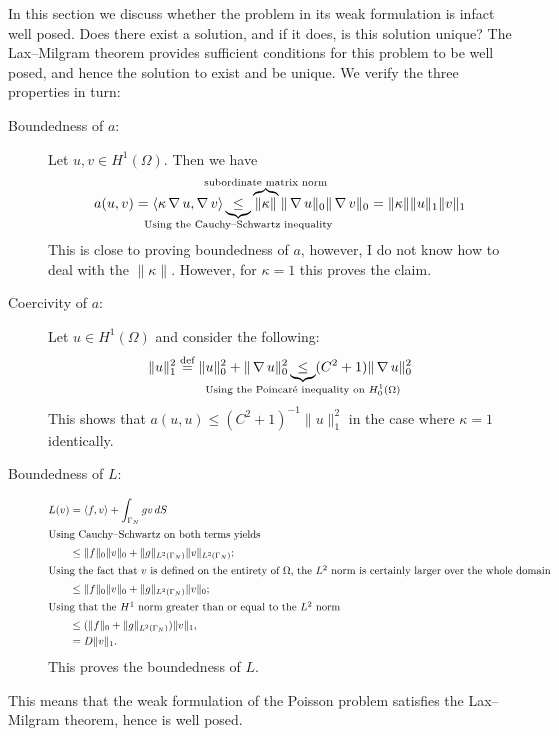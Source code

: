 In this section we discuss whether the problem in its weak formulation is
infact well posed. Does there exist a solution, and if it does, is this
solution unique? The Lax--Milgram theorem provides sufficient conditions for
this problem to be well posed, and hence the solution to exist and be unique.
We verify the three properties in turn:
\begin{description}
    \item[Boundedness of \( a \):]
        Let \( u, v \in H^1(\Omega) \). Then we have
        \begin{equation}
            a(u, v) = \langle \kappa \grad u, \grad v\rangle
            \underbrace{\leq}_{\mathclap{\text{Using the Cauchy--Schwartz inequality}}} 
            \overbrace{\|\kappa\|}^{\mathclap{\text{subordinate matrix norm}}} 
            \| \grad u \|_0 \| \grad v \|_0
            = \|\kappa\| \| u \|_1 \| v \|_1
        \end{equation}
        This is close to proving boundedness of \( a \), however, I do not know
        how to deal with the \( \| \kappa \| \). However, for \( \kappa = 1\)
        this proves the claim.

    \item[Coercivity of \(a \):]
        Let \( u \in H^1 (\Omega) \) and consider the following:
        \begin{equation}
            \| u \|_1^2 \overset{\text{def}}{=} \| u \|_0^2 + \| \grad u \|_0^2
            \underbrace{\leq}_{\mathclap{\text{Using the Poincar\'e inequality
            on } H^1_0(\Omega)}} (C^2 + 1) \| \grad u \|_0^2
        \end{equation}
        This shows that \( a(u, u) \leq (C^2 + 1)^{-1} \| u \|_1^2 \) in the
        case where \( \kappa = 1 \) identically. 

    \item[Boundedness of \( L \):]
        \begin{align}
            L(v) &= \langle f, v \rangle + \int_{\Gamma_N} g v\, dS \\
            \shortintertext{Using Cauchy--Schwartz on both terms yields }
                 &\leq \| f\|_0 \| v \|_0 + \| g \|_{L^2(\Gamma_N)} \| v \|_{L^2(\Gamma_N)} ;\\
            \shortintertext{Using the fact that \( v \) is defined on the
            entirety of \( \Omega \), the \( L^2 \) norm is certainly larger
            over the whole domain}
                 &\leq \| f \|_0 \| v \|_0 + \|g\|_{L^2(\Gamma_N)} \| v \|_0;\\
            \shortintertext{Using that the \( H^1 \) norm greater than or equal
            to the \( L^2 \) norm}
                 &\leq (\| f\|_0 + \| g \|_{L^2(\Gamma_N)}) \| v \|_1,\\
                 &= D \| v \|_1.
        \end{align}
        This proves the boundedness of \( L \).
\end{description}
This means that the weak formulation of the Poisson problem satisfies the
Lax--Milgram theorem, hence is well posed.

